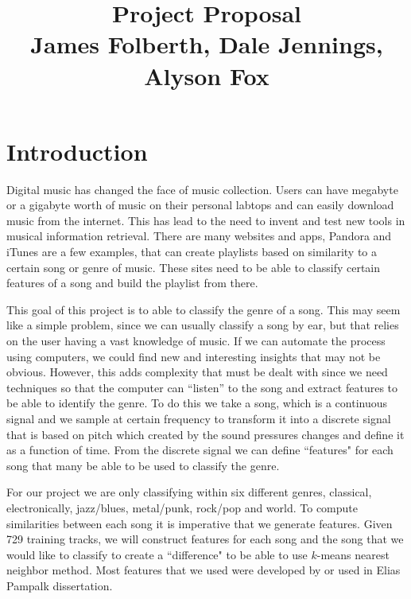 \documentclass[12pt]{article}
\begin{document}
                                       
\title{Project Proposal\\
James Folberth, Dale Jennings, Alyson Fox}
\maketitle
\section{Introduction}
\indent Digital music has changed the face of music collection. Users can have megabyte or a gigabyte worth of music on their personal labtops and can easily download music from the internet. This has lead to the need to invent and test new tools in musical information retrieval. There are many websites and apps, Pandora and iTunes are a few examples, that can create playlists based on similarity to a certain song or genre of music. These sites need to be able to classify certain features of a song and build the playlist from there. 

\indent This goal of this project is to able to classify the genre of a song. This may seem like a simple problem, since we can usually classify a song by ear, but that relies on the user having a vast knowledge of music. If we can automate the process using computers, we could find new and interesting insights that may not be obvious. However, this adds complexity that must be dealt with since we need techniques so that  the computer can ``listen'' to the song and extract features to be able to identify the genre. To do this we take  a song, which is a continuous signal and we sample at certain frequency to transform it into a discrete signal that is based on pitch which created by the sound pressures changes  and define it as a function of time. From the discrete signal we can define  ``features" for each song that many be able to be used to classify the genre. 

\indent For our project we are only classifying within six different genres, classical, electronically, jazz/blues, metal/punk, rock/pop and world. To compute similarities between each song it is imperative that we generate features. Given 729 training tracks, we will construct features for each song and the song that we would like to classify to create a ``difference" to be able to use $k$-means nearest neighbor method. Most features that we used were developed by or used in Elias Pampalk dissertation. \cite{pampalk:dissertation}%
\indent
\end{document}
